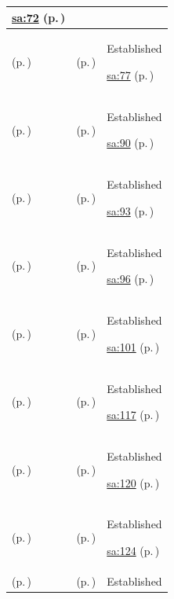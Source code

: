 \begin{longtable}{|>{\raggedright\arraybackslash}p{0.27\TableWidth}|>{\raggedright\arraybackslash}p{0.27\TableWidth}|>{\raggedright\arraybackslash}p{0.46\TableWidth}|}
 \hyperref[rad:sa:63]{sa:72} (p.\,\pageref{rad:sa:63})\\\hline
\nameref{service:encounter-location-history-query} (p.\,\pageref{service:encounter-location-history-query}) & \nameref{feature:feat-sa-10} (p.\,\pageref{feature:feat-sa-10}) & Established

 \hyperref[rad:sa:63]{sa:77} (p.\,\pageref{rad:sa:63})\\\hline
\nameref{service:order-requisition-ingress} (p.\,\pageref{service:order-requisition-ingress}) & \nameref{feature:feat-sa-11} (p.\,\pageref{feature:feat-sa-11}) & Established

 \hyperref[rad:sa:83]{sa:90} (p.\,\pageref{rad:sa:83})\\\hline
\nameref{service:order-dispatch-service} (p.\,\pageref{service:order-dispatch-service}) & \nameref{feature:feat-sa-12} (p.\,\pageref{feature:feat-sa-12}) & Established

 \hyperref[rad:sa:83]{sa:93} (p.\,\pageref{rad:sa:83})\\\hline
\nameref{service:order-status-tracking-query} (p.\,\pageref{service:order-status-tracking-query}) & \nameref{feature:feat-sa-13} (p.\,\pageref{feature:feat-sa-13}) & Established

 \hyperref[rad:sa:83]{sa:96} (p.\,\pageref{rad:sa:83})\\\hline
\nameref{service:order-cancellation-service} (p.\,\pageref{service:order-cancellation-service}) & \nameref{feature:feat-sa-14} (p.\,\pageref{feature:feat-sa-14}) & Established

 \hyperref[rad:sa:83]{sa:101} (p.\,\pageref{rad:sa:83})\\\hline
\nameref{service:diagnostic-correlation-resolution} (p.\,\pageref{service:diagnostic-correlation-resolution}) & \nameref{feature:feat-sa-15} (p.\,\pageref{feature:feat-sa-15}) & Established

 \hyperref[rad:sa:110]{sa:117} (p.\,\pageref{rad:sa:110})\\\hline
\nameref{service:diagnostic-report-ingress} (p.\,\pageref{service:diagnostic-report-ingress}) & \nameref{feature:feat-sa-16} (p.\,\pageref{feature:feat-sa-16}) & Established

 \hyperref[rad:sa:110]{sa:120} (p.\,\pageref{rad:sa:110})\\\hline
\nameref{service:diagnostic-result-delivery-service} (p.\,\pageref{service:diagnostic-result-delivery-service}) & \nameref{feature:feat-sa-17} (p.\,\pageref{feature:feat-sa-17}) & Established

 \hyperref[rad:sa:110]{sa:124} (p.\,\pageref{rad:sa:110})\\\hline
\nameref{service:medication-order-ingress} (p.\,\pageref{service:medication-order-ingress}) & \nameref{feature:feat-sa-18} (p.\,\pageref{feature:feat-sa-18}) & Established


\end{longtable}
